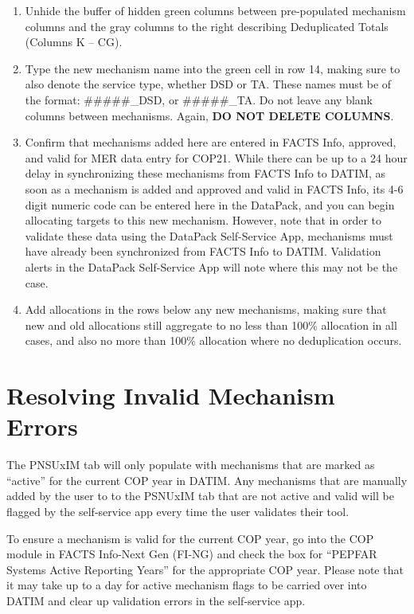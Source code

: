 \documentclass[
  openany]{book}
\begin{document}
\begin{enumerate}
  \begin{enumerate}
  \def\labelenumii{\alph{enumii}.}
  \item
    Unhide the buffer of hidden green columns between pre-populated
    mechanism columns and the gray columns to the right describing
    Deduplicated Totals (Columns K -- CG).
  \item
    Type the new mechanism name into the green cell in row 14,
    making sure to also denote the service type, whether DSD or TA.
    These names must be of the format: \#\#\#\#\#\_DSD, or \#\#\#\#\#\_TA. Do
    not leave any blank columns between mechanisms. Again, \textbf{DO NOT
    DELETE COLUMNS}.
  \item
    Confirm that mechanisms added here are entered in FACTS Info,
    approved, and valid for MER data entry for COP21. While there
    can be up to a 24 hour delay in synchronizing these mechanisms
    from FACTS Info to DATIM, as soon as a mechanism is added and
    approved and valid in FACTS Info, its 4-6 digit numeric code can
    be entered here in the DataPack, and you can begin allocating
    targets to this new mechanism. However, note that in order to
    validate these data using the DataPack Self-Service App,
    mechanisms must have already been synchronized from FACTS Info
    to DATIM. Validation alerts in the DataPack Self-Service App
    will note where this may not be the case.
  \item
    Add allocations in the rows below any new mechanisms, making
    sure that new and old allocations still aggregate to no less
    than 100\% allocation in all cases, and also no more than 100\%
    allocation where no deduplication occurs.
  \end{enumerate}
\end{enumerate}

\hypertarget{resolving-invalid-mechanism-errors}{%
\section{Resolving Invalid Mechanism Errors}\label{resolving-invalid-mechanism-errors}}

The PNSUxIM tab will only populate with mechanisms that are marked as
``active'' for the current COP year in DATIM. Any mechanisms that are
manually added by the user to to the PSNUxIM tab that are not active and
valid will be flagged by the self-service app every time the user
validates their tool.

To ensure a mechanism is valid for the current COP year, go into the COP
module in FACTS Info-Next Gen (FI-NG) and check the box for ``PEPFAR
Systems Active Reporting Years'' for the appropriate COP year. Please
note that it may take up to a day for active mechanism flags to be
carried over into DATIM and clear up validation errors in the
self-service app.
\end{document}
